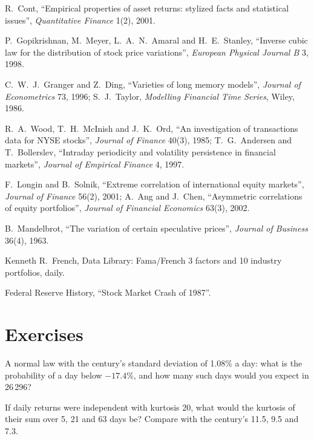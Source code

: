 \begin{omsources}
\item R.~Cont, ``Empirical properties of asset returns: stylized facts and statistical issues'', \emph{Quantitative Finance} 1(2),
2001.
\item P.~Gopikrishnan, M.~Meyer, L.~A.~N.~Amaral and H.~E.~Stanley, ``Inverse cubic law for the distribution of stock price
variations'', \emph{European Physical Journal B} 3, 1998.
\item C.~W.~J.~Granger and Z.~Ding, ``Varieties of long memory models'', \emph{Journal of Econometrics} 73, 1996; S.~J.~Taylor,
\emph{Modelling Financial Time Series}, Wiley, 1986.
\item R.~A.~Wood, T.~H.~McInish and J.~K.~Ord, ``An investigation of transactions data for NYSE stocks'', \emph{Journal of Finance}
40(3), 1985; T.~G.~Andersen and T.~Bollerslev, ``Intraday periodicity and volatility persistence in financial markets'',
\emph{Journal of Empirical Finance} 4, 1997.
\item F.~Longin and B.~Solnik, ``Extreme correlation of international equity markets'', \emph{Journal of Finance} 56(2), 2001;
A.~Ang and J.~Chen, ``Asymmetric correlations of equity portfolios'', \emph{Journal of Financial Economics} 63(3), 2002.
\item B.~Mandelbrot, ``The variation of certain speculative prices'', \emph{Journal of Business} 36(4), 1963.
\item Kenneth R.~French, Data Library: Fama/French 3 factors and 10 industry portfolios, daily.
\item Federal Reserve History, ``Stock Market Crash of 1987''.
\end{omsources}

\section{Exercises}

\begin{exercise}[$\star$]\label{exo:rs:stylised-facts-of-returns:1}
A normal law with the century's standard deviation of 1.08\% a day: what is the probability of a day below $-17.4\%$, and how many
such days would you expect in 26\,296?
\end{exercise}

\begin{exercise}[$\star$]\label{exo:rs:stylised-facts-of-returns:2}
If daily returns were independent with kurtosis 20, what would the kurtosis of their sum over 5, 21 and 63 days be? Compare with the
century's 11.5, 9.5 and 7.3.
\end{exercise}

